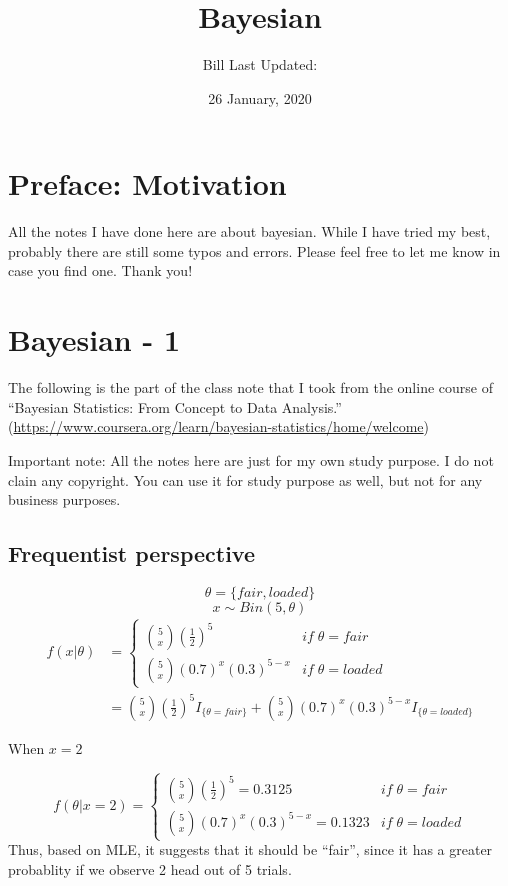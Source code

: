 \documentclass[]{book}
\title{Bayesian}
\author{Bill Last Updated:}
\date{26 January, 2020}
\begin{document}
\maketitle

{
\setcounter{tocdepth}{1}
\tableofcontents
}
\chapter*{Preface: Motivation}\label{my-section}

All the notes I have done here are about bayesian. While I have tried my
best, probably there are still some typos and errors. Please feel free
to let me know in case you find one. Thank you!

\chapter{Bayesian - 1}\label{bayesian---1}

The following is the part of the class note that I took from the online
course of ``Bayesian Statistics: From Concept to Data Analysis.''
(\url{https://www.coursera.org/learn/bayesian-statistics/home/welcome})

Important note: All the notes here are just for my own study purpose. I
do not clain any copyright. You can use it for study purpose as well,
but not for any business purposes.

\section{Frequentist perspective}\label{frequentist-perspective}

\[\theta = \{ fair , loaded \}\] \[x \sim Bin (5, \theta)\]
\[\begin{aligned} f(x|\theta) &=\begin{cases} \binom{5}{x} (\frac{1}{2})^5 & if \; \theta=fair  \\ \binom{5}{x} (0.7)^x(0.3)^{5-x} & if \;  \theta=loaded  \end{cases} \\ &= \binom{5}{x} (\frac{1}{2})^5 I_{\{\theta=fair \}}+\binom{5}{x} (0.7)^x(0.3)^{5-x}I_{\{\theta=loaded \}}\end{aligned}\]

When \(x=2\)

\[f(\theta | x=2)=\begin{cases} \binom{5}{x} (\frac{1}{2})^5 = 0.3125& if \; \theta=fair  \\ \binom{5}{x} (0.7)^x(0.3)^{5-x} = 0.1323& if \;  \theta=loaded  \end{cases}\]
Thus, based on MLE, it suggests that it should be ``fair'', since it has
a greater probablity if we observe 2 head out of 5 trials.
\end{document}

